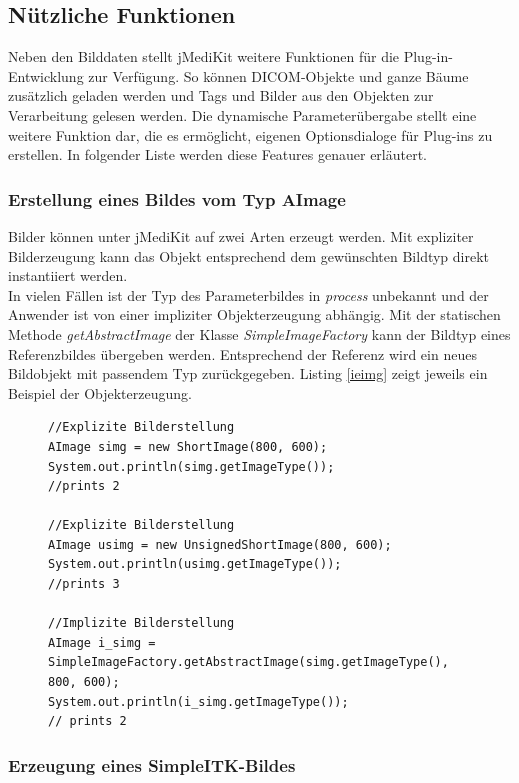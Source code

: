 \FloatBarrier
\subsection{Nützliche Funktionen}

Neben den Bilddaten stellt jMediKit weitere Funktionen für die Plug-in-Entwicklung zur Verfügung. So können DICOM-Objekte und ganze Bäume zusätzlich geladen werden und Tags und Bilder aus den Objekten zur Verarbeitung gelesen werden. Die dynamische Parameterübergabe stellt eine weitere Funktion dar, die es ermöglicht, eigenen Optionsdialoge für Plug-ins zu erstellen. In folgender Liste werden diese Features genauer erläutert.

\subsubsection{Erstellung eines Bildes vom Typ AImage}
Bilder können unter jMediKit auf zwei Arten erzeugt werden. Mit expliziter Bilderzeugung kann das Objekt entsprechend dem gewünschten Bildtyp direkt instantiiert werden.\\
In vielen Fällen ist der Typ des Parameterbildes in \textit{process} unbekannt und der Anwender ist von einer impliziter Objekterzeugung abhängig. Mit der statischen Methode \textit{getAbstractImage} der Klasse \textit{SimpleImageFactory} kann der Bildtyp eines Referenzbildes übergeben werden. Entsprechend der Referenz wird ein neues Bildobjekt mit passendem Typ zurückgegeben. Listing \ref{ieimg} zeigt jeweils ein Beispiel der Objekterzeugung.

\begin{figure}[htbp]
\begin{lstlisting}[frame=leftline]
//Explizite Bilderstellung
AImage simg = new ShortImage(800, 600);
System.out.println(simg.getImageType());
//prints 2

//Explizite Bilderstellung
AImage usimg = new UnsignedShortImage(800, 600);
System.out.println(usimg.getImageType());
//prints 3
		
//Implizite Bilderstellung
AImage i_simg = SimpleImageFactory.getAbstractImage(simg.getImageType(), 800, 600);
System.out.println(i_simg.getImageType());
// prints 2
\end{lstlisting}
\end{figure}

\subsubsection{Erzeugung eines SimpleITK-Bildes}

